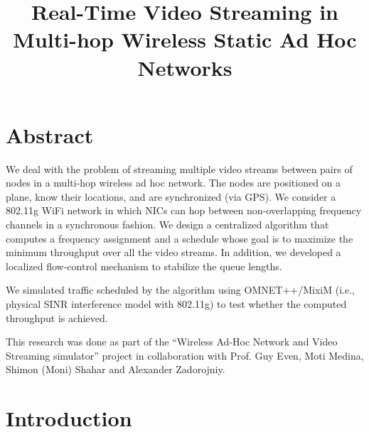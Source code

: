 \documentclass[12pt,oneside,english,a4paper]{book}
\theoremstyle{plain}
\theoremstyle{definition}
\theoremstyle{Theorem}
\theoremstyle{plain}
\newenvironment{proof sketch}[1]{\noindent {\emph{Proof sketch of #1:}}}{\hfill \qed}
\begin{document}
\title{Real-Time Video Streaming in Multi-hop Wireless Static Ad Hoc Networks}






\setcounter{page}{1}
\chapter*{Abstract}
  We deal with the problem of streaming multiple video streams between
  pairs of nodes in a multi-hop wireless ad hoc network.  The nodes
  are positioned on a plane, know their locations, and are
  synchronized (via GPS). We consider a 802.11g WiFi network in which
  NICs can hop between non-overlapping frequency channels in a
  synchronous fashion. We design a centralized algorithm that computes
  a frequency assignment and a schedule whose goal is to maximize the
  minimum throughput over all the video streams.  In addition, we
  developed a localized flow-control mechanism to stabilize the queue
  lengths.

  We simulated traffic scheduled by the algorithm using OMNET++/MixiM
  (i.e., physical SINR interference model with 802.11g) to test
  whether the computed throughput is achieved.
  
\newpage
This research was done as part of the ``Wireless Ad-Hoc Network and Video Streaming simulator'' project in collaboration with Prof. Guy Even, Moti Medina, Shimon (Moni) Shahar and Alexander Zadorojniy.

\tableofcontents{}
\listoffigures{}
\listoftables{}

\newpage
{}
\setcounter{page}{1}
\chapter{Introduction}
\end{document}
